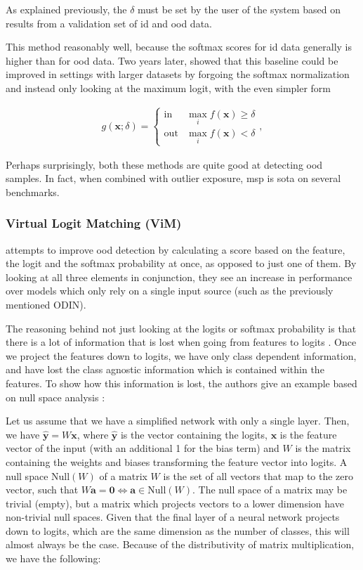 \documentclass[UKenglish]{uiomasterthesis} %
\theoremstyle{definition}
\begin{document}
As explained previously, the $\delta$ must be set by the user of the system based on results from a validation set of \ac{id} and \ac{ood} data.

This method reasonably well, because the softmax scores for \ac{id} data generally is higher than for \ac{ood} data. Two years later, \cite{mls} showed that this baseline could be improved in settings with larger datasets by forgoing the softmax normalization and instead only looking at the maximum logit, with the even simpler form

\begin{align}
\label{eq:mls}
    g(\bm{x}; \delta)=\begin{cases} 
        \text{in } & \max_i f(\bm{x})\ge \delta \\
        \text{out} & \max_i f(\bm{x}) < \delta 
   \end{cases},
\end{align}

Perhaps surprisingly, both these methods are quite good at detecting \ac{ood} samples. In fact, when combined with outlier exposure, \ac{msp} is \ac{sota} on several benchmarks.

\subsubsection{Virtual Logit Matching (ViM)} \label{section:vim}

\cite{vim} attempts to improve \ac{ood} detection by calculating a score based on the feature, the logit and the softmax probability at once, as opposed to just one of them. By looking at all three elements in conjunction, they see an increase in performance over models which only rely on a single input source (such as the previously mentioned ODIN).

The reasoning behind not just looking at the logits or softmax probability is that there is a lot of information that is lost when going from features to logits \cite{vim}. Once we project the features down to logits, we have only class dependent information, and have lost the class agnostic information which is contained within the features. To show how this information is lost, the authors give an example based on null space analysis \cite{nusa}:

Let us assume that we have a simplified network with only a single layer. Then, we have $\hat{\bm{y}} = W \bm{x}$, where $\hat{\bm{y}}$ is the vector containing the logits, $\bm{x}$ is the feature vector of the input (with an additional 1 for the bias term) and $W$ is the matrix containing the weights and biases transforming the feature vector into logits. A null space $\text{Null}(W)$ of a matrix $W$ is the set of all vectors that map to the zero vector, such that $W \bm{a} = \bm{0} \iff \bm{a} \in \text{Null}(W)$. The null space of a matrix may be trivial (empty), but a matrix which projects vectors to a lower dimension have non-trivial null spaces. Given that the final layer of a neural network projects down to logits, which are the same dimension as the number of classes, this will almost always be the case. Because of the distributivity of matrix multiplication, we have the following:
\end{document}
